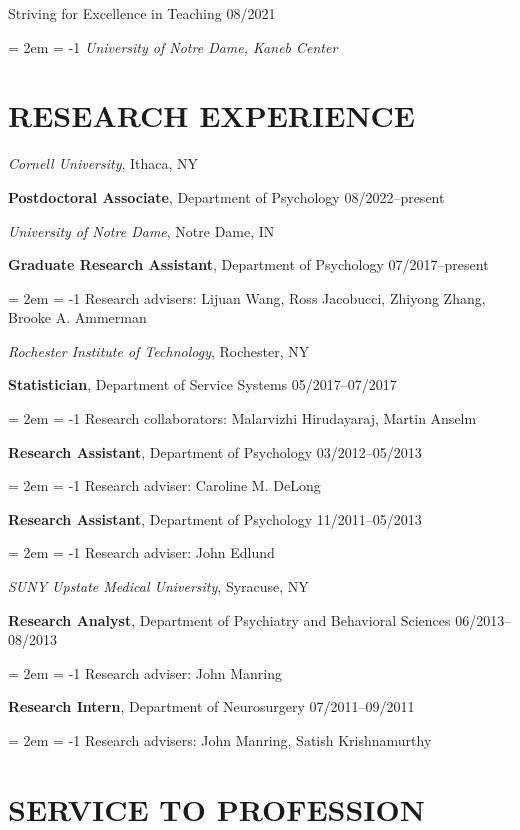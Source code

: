\documentclass[
  12 pt,
]{article}
\begin{document}
Striving for Excellence in Teaching \hfill 08/2021

\hangindent = 2em \hangafter = -1 \emph{University of Notre Dame, Kaneb
Center}

\hypertarget{research-experience}{%
\section{RESEARCH EXPERIENCE}\label{research-experience}}

\emph{Cornell University}, Ithaca, NY

\textbf{Postdoctoral Associate}, Department of Psychology
\hfill 08/2022--present

\emph{University of Notre Dame}, Notre Dame, IN

\textbf{Graduate Research Assistant}, Department of Psychology \hfill
07/2017--present

\hangindent = 2em \hangafter = -1 Research advisers: Lijuan Wang, Ross
Jacobucci, Zhiyong Zhang, Brooke A. Ammerman

\emph{Rochester Institute of Technology}, Rochester, NY

\textbf{Statistician}, Department of Service Systems
\hfill 05/2017--07/2017

\hangindent = 2em \hangafter = -1 Research collaborators: Malarvizhi
Hirudayaraj, Martin Anselm

\textbf{Research Assistant}, Department of Psychology
\hfill 03/2012--05/2013

\hangindent = 2em \hangafter = -1 Research adviser: Caroline M. DeLong

\textbf{Research Assistant}, Department of Psychology
\hfill 11/2011--05/2013

\hangindent = 2em \hangafter = -1 Research adviser: John Edlund

\emph{SUNY Upstate Medical University}, Syracuse, NY

\textbf{Research Analyst}, Department of Psychiatry and Behavioral
Sciences \hfill
06/2013--08/2013

\hangindent = 2em \hangafter = -1 Research adviser: John Manring

\textbf{Research Intern}, Department of Neurosurgery
\hfill 07/2011--09/2011

\hangindent = 2em \hangafter = -1 Research advisers: John Manring,
Satish Krishnamurthy

\hypertarget{service-to-profession}{%
\section{SERVICE TO PROFESSION}\label{service-to-profession}}
\end{document}
